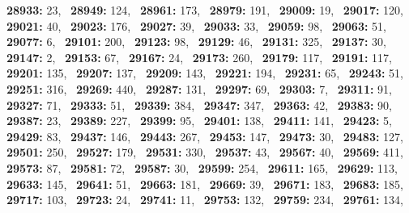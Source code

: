 \textbf{28933:} 23,\allowbreak~ 
\textbf{28949:} 124,\allowbreak~ 
\textbf{28961:} 173,\allowbreak~ 
\textbf{28979:} 191,\allowbreak~ 
\textbf{29009:} 19,\allowbreak~ 
\textbf{29017:} 120,\allowbreak~ 
\textbf{29021:} 40,\allowbreak~ 
\textbf{29023:} 176,\allowbreak~ 
\textbf{29027:} 39,\allowbreak~ 
\textbf{29033:} 33,\allowbreak~ 
\textbf{29059:} 98,\allowbreak~ 
\textbf{29063:} 51,\allowbreak~ 
\textbf{29077:} 6,\allowbreak~ 
\textbf{29101:} 200,\allowbreak~ 
\textbf{29123:} 98,\allowbreak~ 
\textbf{29129:} 46,\allowbreak~ 
\textbf{29131:} 325,\allowbreak~ 
\textbf{29137:} 30,\allowbreak~ 
\textbf{29147:} 2,\allowbreak~ 
\textbf{29153:} 67,\allowbreak~ 
\textbf{29167:} 24,\allowbreak~ 
\textbf{29173:} 260,\allowbreak~ 
\textbf{29179:} 117,\allowbreak~ 
\textbf{29191:} 117,\allowbreak~ 
\textbf{29201:} 135,\allowbreak~ 
\textbf{29207:} 137,\allowbreak~ 
\textbf{29209:} 143,\allowbreak~ 
\textbf{29221:} 194,\allowbreak~ 
\textbf{29231:} 65,\allowbreak~ 
\textbf{29243:} 51,\allowbreak~ 
\textbf{29251:} 316,\allowbreak~ 
\textbf{29269:} 440,\allowbreak~ 
\textbf{29287:} 131,\allowbreak~ 
\textbf{29297:} 69,\allowbreak~ 
\textbf{29303:} 7,\allowbreak~ 
\textbf{29311:} 91,\allowbreak~ 
\textbf{29327:} 71,\allowbreak~ 
\textbf{29333:} 51,\allowbreak~ 
\textbf{29339:} 384,\allowbreak~ 
\textbf{29347:} 347,\allowbreak~ 
\textbf{29363:} 42,\allowbreak~ 
\textbf{29383:} 90,\allowbreak~ 
\textbf{29387:} 23,\allowbreak~ 
\textbf{29389:} 227,\allowbreak~ 
\textbf{29399:} 95,\allowbreak~ 
\textbf{29401:} 138,\allowbreak~ 
\textbf{29411:} 141,\allowbreak~ 
\textbf{29423:} 5,\allowbreak~ 
\textbf{29429:} 83,\allowbreak~ 
\textbf{29437:} 146,\allowbreak~ 
\textbf{29443:} 267,\allowbreak~ 
\textbf{29453:} 147,\allowbreak~ 
\textbf{29473:} 30,\allowbreak~ 
\textbf{29483:} 127,\allowbreak~ 
\textbf{29501:} 250,\allowbreak~ 
\textbf{29527:} 179,\allowbreak~ 
\textbf{29531:} 330,\allowbreak~ 
\textbf{29537:} 43,\allowbreak~ 
\textbf{29567:} 40,\allowbreak~ 
\textbf{29569:} 411,\allowbreak~ 
\textbf{29573:} 87,\allowbreak~ 
\textbf{29581:} 72,\allowbreak~ 
\textbf{29587:} 30,\allowbreak~ 
\textbf{29599:} 254,\allowbreak~ 
\textbf{29611:} 165,\allowbreak~ 
\textbf{29629:} 113,\allowbreak~ 
\textbf{29633:} 145,\allowbreak~ 
\textbf{29641:} 51,\allowbreak~ 
\textbf{29663:} 181,\allowbreak~ 
\textbf{29669:} 39,\allowbreak~ 
\textbf{29671:} 183,\allowbreak~ 
\textbf{29683:} 185,\allowbreak~ 
\textbf{29717:} 103,\allowbreak~ 
\textbf{29723:} 24,\allowbreak~ 
\textbf{29741:} 11,\allowbreak~ 
\textbf{29753:} 132,\allowbreak~ 
\textbf{29759:} 234,\allowbreak~ 
\textbf{29761:} 134,\allowbreak~ 

